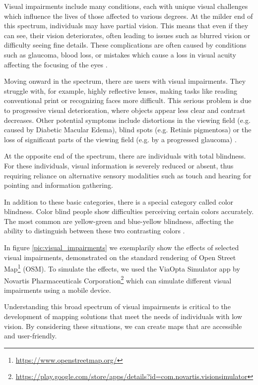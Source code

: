 \documentclass[agile, final]{copernicus-agile}
\begin{document}
Visual impairments include many conditions, each with unique visual challenges which influence the lives of those affected to various degrees. At the milder end of this spectrum, individuals may have partial vision. This means that even if they can see, their vision deteriorates, often leading to issues such as blurred vision or difficulty seeing fine details. These complications are often caused by conditions such as glaucoma, blood loss, or mistakes which cause a loss in visual acuity affecting the focusing of the eyes \citep{WHO2019}.

Moving onward in the spectrum, there are users with visual impairments. They struggle with, for example, highly reflective lenses, making tasks like reading conventional print or recognizing faces more difficult. This serious problem is due to progressive visual deterioration, where objects appear less clear and contrast decreases. Other potential symptoms include distortions in the viewing field (e.g. caused by Diabetic Macular Edema), blind spots (e.g. Retinis pigmentosa) or the loss of significant parts of the viewing field (e.g. by a progressed glaucoma) \citep{WHO2019}.  

At the opposite end of the spectrum, there are individuals with total blindness. For these individuals, visual information is severely reduced or absent, thus requiring reliance on alternative sensory modalities such as touch and hearing for pointing and information gathering.

In addition to these basic categories, there is a special category called color blindness. Color blind people show difficulties perceiving certain colors accurately. The most common are yellow-green and blue-yellow blindness, affecting the ability to distinguish between these two contrasting colors \citep{JennyKelso2007, NEI2023}.

In figure \ref{pic:visual_impairments} we exemplarily show the effects of selected visual impairments, demonstrated on the standard rendering of Open Street Map\footnote{\url{https://www.openstreetmap.org/}} (OSM). To simulate the effects, we used the ViaOpta Simulator app by Novartis Pharmaceuticals Corporation\footnote{\label{fn:viaopta}\url{https://play.google.com/store/apps/details?id=com.novartis.visionsimulator}} which can simulate different visual impairments using a mobile device.

Understanding this broad spectrum of visual impairments is critical to the development of mapping solutions that meet the needs of individuals with low vision. By considering these situations, we can create maps that are accessible and user-friendly.
\end{document}
